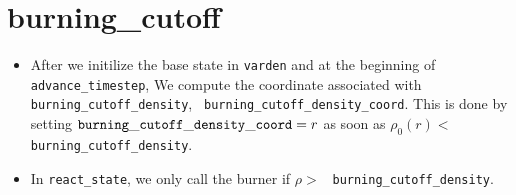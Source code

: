 \documentclass[11pt]{article}
\begin{document}
\section{burning\_cutoff}

\begin{itemize}
\item After we initilize the base state in {\tt varden} and at the
  beginning of {\tt advance\_timestep}, We compute the coordinate
  associated with {\tt burning\_cutoff\_density}, {\tt
    burning\_cutoff\_density\_coord}.  This is done by setting ${\tt
    burning\_cutoff\_density\_coord}= r$ as soon as $\rho_0(r) <$ {\tt
    burning\_cutoff\_density}.

\item In {\tt react\_state}, we only call the burner if $\rho >$ {\tt
  burning\_cutoff\_density}.
\end{itemize}
\end{document}
